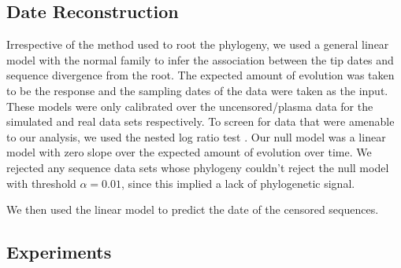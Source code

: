 \documentclass[12pt]{article}
\begin{document}
\subsection * {Date Reconstruction} \label{subsec:daterecon}

Irrespective of the method used to root the phylogeny, we used a general linear model with the normal family to infer the association between the tip dates and sequence divergence from the root. 
The expected amount of evolution was taken to be the response and the sampling dates of the data were taken as the input. 
These models were only calibrated over the uncensored/plasma data for the simulated and real data sets respectively.
To screen for data that were amenable to our analysis, we used the nested log ratio test \citep{Ho14}. 
Our null model was a linear model with zero slope over the expected amount of evolution over time.
We rejected any sequence data sets whose phylogeny couldn't reject the null model with threshold $\alpha=0.01$, since this implied a lack of phylogenetic signal.

We then used the linear model to predict the date of the censored sequences.

\subsection * {Experiments} \label{subsec:experiments}
\end{document}
